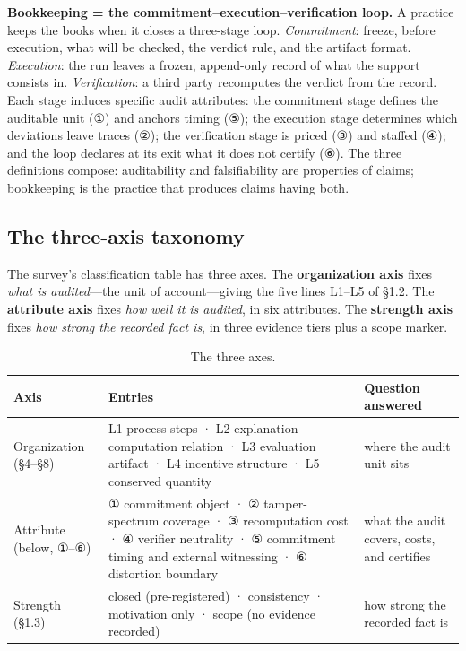 \documentclass[11pt,a4paper]{article}
\begin{document}
\textbf{Bookkeeping = the commitment–execution–verification loop.} A practice keeps the books when it closes a three-stage loop. \textit{Commitment}: freeze, before execution, what will be checked, the verdict rule, and the artifact format. \textit{Execution}: the run leaves a frozen, append-only record of what the support consists in. \textit{Verification}: a third party recomputes the verdict from the record. Each stage induces specific audit attributes: the commitment stage defines the auditable unit (①) and anchors timing (⑤); the execution stage determines which deviations leave traces (②); the verification stage is priced (③) and staffed (④); and the loop declares at its exit what it does not certify (⑥). The three definitions compose: auditability and falsifiability are properties of claims; bookkeeping is the practice that produces claims having both.

\subsection{The three-axis taxonomy}

The survey's classification table has three axes. The \textbf{organization axis} fixes \textit{what is audited}—the unit of account—giving the five lines L1–L5 of §1.2. The \textbf{attribute axis} fixes \textit{how well it is audited}, in six attributes. The \textbf{strength axis} fixes \textit{how strong the recorded fact is}, in three evidence tiers plus a scope marker.

\begin{table}[htbp]
\centering
\footnotesize
\setlength{\tabcolsep}{3.5pt}
\renewcommand{\arraystretch}{1.18}
\begin{tabularx}{0.985\textwidth}{>{\raggedright\arraybackslash}p{} >{\raggedright\arraybackslash}X >{\raggedright\arraybackslash}p{}}
\toprule
\textbf{Axis} & \textbf{Entries} & \textbf{Question answered} \\
\midrule
Organization (§4–§8) & L1 process steps · L2 explanation–computation relation · L3 evaluation artifact · L4 incentive structure · L5 conserved quantity & where the audit unit sits \\
Attribute (below, ①–⑥) & ① commitment object · ② tamper-spectrum coverage · ③ recomputation cost · ④ verifier neutrality · ⑤ commitment timing and external witnessing · ⑥ distortion boundary & what the audit covers, costs, and certifies \\
Strength (§1.3) & closed (pre-registered) · consistency · motivation only · scope (no evidence recorded) & how strong the recorded fact is \\
\bottomrule
\end{tabularx}
\caption{The three axes.}
\label{tab:T1}
\end{table}
\end{document}
